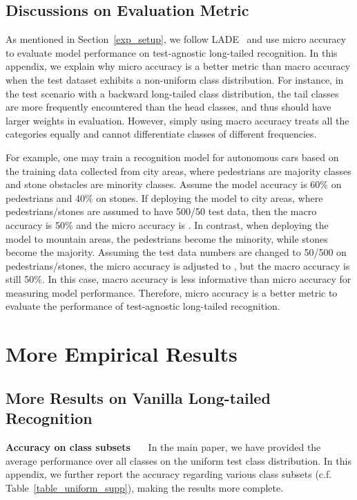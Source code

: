 \documentclass{article}
\begin{document}
\subsection{Discussions on Evaluation Metric} \label{App_C4}
As mentioned in Section~\ref{exp_setup}, we follow LADE~\cite{hong2020disentangling} and use micro accuracy to evaluate model performance on test-agnostic long-tailed recognition. In this appendix, we   explain why  micro accuracy is a better metric than  macro accuracy when the test dataset exhibits a non-uniform class distribution. 
For instance, in  the test scenario with a backward long-tailed class     distribution, the tail classes are more frequently encountered than the head classes, and thus should have larger weights in evaluation.  However, simply using macro accuracy treats all the categories equally and cannot differentiate classes of different frequencies. 

For example,  one may train a  recognition model for autonomous cars based on the training data collected from city areas, where pedestrians are majority classes and stone obstacles are minority classes. Assume the model accuracy is 60\%  on pedestrians and 40\%  on stones. If deploying the model to   city areas, where pedestrians/stones are assumed to have 500/50 test data,  then the macro accuracy is  50\% and the micro accuracy is . In contrast,  when deploying the model to mountain areas, the pedestrians become the minority, while stones become the majority. 
Assuming the test data numbers are changed to 50/500 on pedestrians/stones, the micro accuracy is adjusted  to , but the macro accuracy is still 50\%. In this case,   macro accuracy is less informative than micro accuracy for measuring model performance. Therefore, micro accuracy  is a better metric to evaluate the performance of test-agnostic long-tailed recognition. 

 

  
  
\clearpage
\section{More Empirical Results}\label{App_D}
 
\subsection{More Results on Vanilla Long-tailed Recognition}\label{App_D3}
\textbf{Accuracy on class subsets}~~~ In the main paper, we have provided the average performance over all classes on the uniform test class distribution. In this appendix, we further report the accuracy  regarding various class subsets (c.f.~ Table~\ref{table_uniform_supp}),   making the results more complete.  
\end{document}
